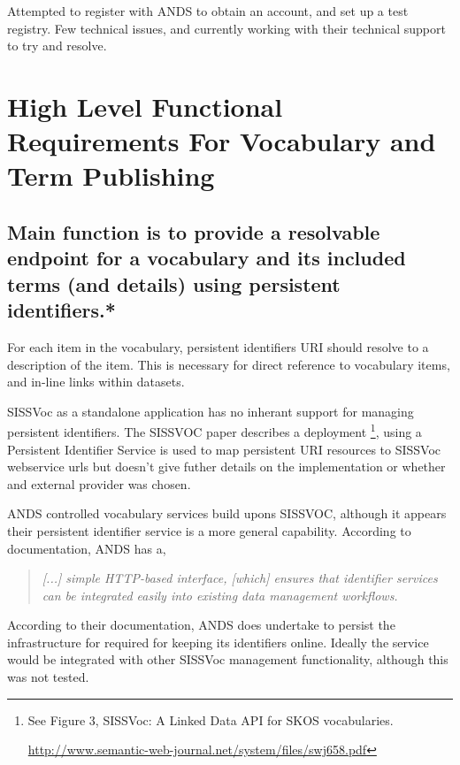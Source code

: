 \documentclass[10pt,a4paper]{article}
\newenvironment{italicquotes}
{\begin{quote}\itshape}
{\end{quote}}
\begin{document}
\begin{flushleft}
  \item[] 
	Attempted to register with ANDS to obtain an account, and set up a test
	registry. Few technical issues, and currently working with their technical
	support to try and resolve.
		

\section { 
	High Level Functional Requirements For Vocabulary and Term Publishing
}

  \subsection{
   Main function is to provide a resolvable endpoint for a vocabulary and its
  included terms (and details) using persistent identifiers.* 
  }

  For each item in the vocabulary, persistent identifiers {URI} should
  resolve to a description of the item.  This is necessary for direct reference to
  vocabulary items, and in-line links within datasets.

  \item[SISSVoc] as a standalone application has no inherant support for managing persistent
  identifiers. The SISSVOC paper describes a deployment \footnote{ See Figure 3,
  SISSVoc: A Linked Data API for SKOS vocabularies.

  \url{http://www.semantic-web-journal.net/system/files/swj658.pdf} }, using a
  Persistent Identifier Service is used to map persistent URI resources to SISSVoc
  webservice urls but doesn't give futher details on the implementation or
  whether and external provider was chosen. 

  \item[ANDS] controlled vocabulary services build upons SISSVOC, although it appears
  their persistent identifier service is a more general capability. According to
  documentation, ANDS has a, 

  \begin{italicquotes} [...] simple HTTP-based interface, [which] ensures that
  identifier services can be integrated easily into existing data management
  workflows.  \end{italicquotes}
  According to their documentation, ANDS does undertake to persist the infrastructure for required for
  keeping its identifiers online. Ideally the service would be integrated
  with other SISSVoc management functionality, although this was not tested.


\end{flushleft}
\end{document}
